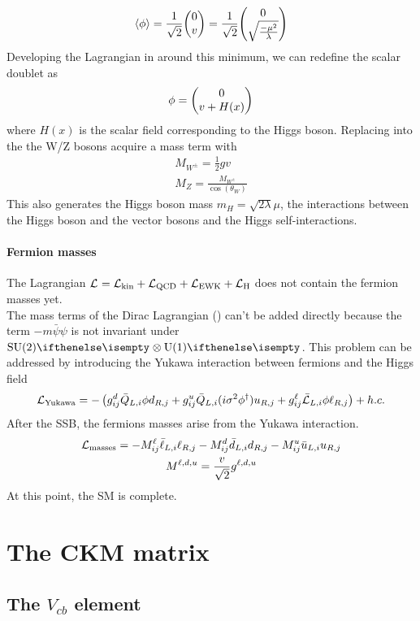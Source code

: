 \begin{equation}
    \langle\phi\rangle=\frac{1}{\sqrt{2}}\db{0}{v}=\frac{1}{\sqrt{2}}\db{0}{\sqrt{\frac{-\mu^2}{\lambda}}}
\end{equation}
Developing the Lagrangian in  around this minimum, we can redefine the scalar doublet as
\begin{equation}\label{eq:higgs_intro}
    \phi=\db{0}{v+H(x)}
\end{equation}
where $H(x)$ is the scalar field corresponding to the Higgs boson. Replacing  into the  the W/Z bosons acquire a mass term with
\begin{gather}
    M_{W^\pm}=\frac{1}{2}gv\\
    M_Z=\frac{M_{W^\pm}}{\cos (\theta_W)}
\end{gather}
This also generates the Higgs boson mass $m_H=\sqrt{2\lambda}\mu$, the interactions between the Higgs boson and the vector bosons and the Higgs self-interactions.
\paragraph*{Fermion masses}
The Lagrangian $\mathcal{L}_\text{}=\mathcal{L}_\text{kin}+\mathcal{L}_\text{QCD}+\mathcal{L}_\text{EWK}+\mathcal{L}_\text{H}$ does not contain the fermion masses yet.\\
The mass terms of the Dirac Lagrangian () can't be added directly because the term \(-m \bar{\psi} \psi\) is not invariant under $\SU{2}\otimes \U{1}$.
This problem can be addressed by introducing the Yukawa interaction between fermions and the Higgs field
\begin{equation}
    \mathcal{L}_\text{Yukawa}=-\left(g_{i j}^{d}\bar{Q}_{L,i}\phi d_{R,j}+g_{i j}^{u}\bar{Q}_{L,i}(i\sigma^{2}\phi^{\dagger})u_{R,j}+g_{i j}^{\ell}\bar{\mathcal{L}}_{L,i}\phi\ell_{R,j}\right)+h.c.
\end{equation}
After the SSB, the fermions masses arise from the Yukawa interaction.
\begin{gather}
    \mathcal{L}_\text{masses}=-M_{i j}^{\ell}\bar{\ell}_{L,i}\ell_{R,j}-M_{i j}^{d}\bar{d}_{L,i}d_{R,j}-M_{i j}^{u}\bar{u}_{L,i}u_{R,j}\\
    M^{\ell,d,u}=\frac{v}{\sqrt{2}}g^{\ell,d,u}
\end{gather}
At this point, the SM is complete. 
\section{The CKM matrix}\label{sec:CKM}
\subsection{The $V_{cb}$ element}

